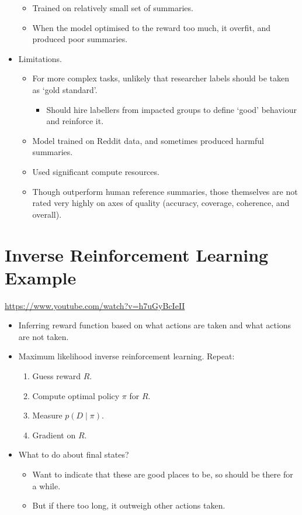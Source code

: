 \begin{itemize}
\begin{itemize}
        \item Trained on relatively small set of summaries.
        \item When the model optimised to the reward too much, it overfit, and produced poor summaries.
    \end{itemize}
    \item Limitations.
    \begin{itemize}
        \item For more complex tasks, unlikely that researcher labels should be taken as `gold standard'.
        \begin{itemize}
            \item Should hire labellers from impacted groups to define `good' behaviour and reinforce it.
        \end{itemize}
        \item Model trained on Reddit data, and sometimes produced harmful summaries.
        \item Used significant compute resources.
        \item Though outperform human reference summaries, those themselves are not rated very highly on axes of quality (accuracy, coverage, coherence, and overall).
    \end{itemize}
\end{itemize}


\section{Inverse Reinforcement Learning Example}

\url{https://www.youtube.com/watch?v=h7uGyBcIeII}

\begin{itemize}
    \item Inferring reward function based on what actions are taken and what actions are not taken.
    \item Maximum likelihood inverse reinforcement learning. Repeat:
    \begin{enumerate}[label=(\roman*)]
        \item Guess reward $R$.
        \item Compute optimal policy $\pi$ for $R$.
        \item Measure $p(D \mid \pi)$.
        \item Gradient on $R$.
    \end{enumerate}
    \item What to do about final states?
    \begin{itemize}
        \item Want to indicate that these are good places to be, so should be there for a while.
        \item But if there too long, it outweigh other actions taken.
    \end{itemize}
\end{itemize}


